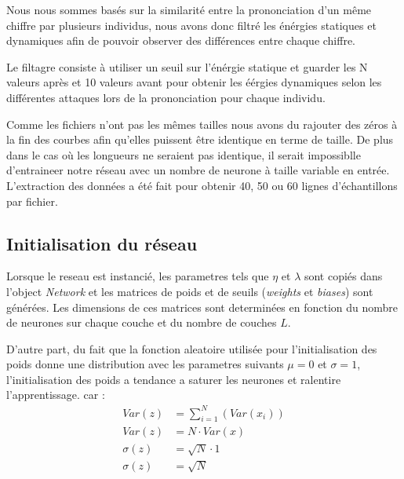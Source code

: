 \documentclass[11pt]{article}
\begin{document}
Nous nous sommes bas\'es sur la similarit\'e entre la prononciation d'un
m\^eme chiffre par plusieurs individus, nous avons donc filtr\'e les \'en\'ergies
statiques et dynamiques afin de pouvoir observer des diff\'erences entre chaque chiffre.


Le filtagre consiste \`a utiliser un seuil sur l'\'en\'ergie statique et
guarder les N valeurs apr\`es et 10 valeurs avant pour obtenir les \'e\'ergies
dynamiques selon les diff\'erentes attaques lors de la prononciation pour chaque
individu.

Comme les fichiers n'ont pas les m\^emes tailles nous avons du rajouter des
z\'eros \`a la fin des courbes afin qu'elles puissent \^etre identique en
terme de taille. De plus dans le cas o\`u les longueurs ne seraient pas
identique, il serait impossiblle d'entraineer notre r\'eseau avec un nombre
de neurone \`a taille variable en entr\'ee.
L'extraction des donn\'ees a \'et\'e fait pour obtenir 40, 50 ou 60 lignes
d'\'echantillons par fichier.



\subsection{Initialisation du r\'eseau}
Lorsque le reseau est instanci\'e, les parametres tels que $\eta$ et $\lambda$
sont copi\'es dans l'object
\emph{Network} et les matrices de poids et de seuils (\emph{weights} et
\emph{biases}) sont g\'en\'er\'ees. Les dimensions de ces matrices sont
determin\'ees en fonction du nombre de neurones sur chaque couche et du nombre
de couches $L$.


D'autre part, du fait que la fonction aleatoire utilis\'ee pour l'initialisation
des poids donne une distribution avec les parametres suivants $\mu=0$ et $\sigma=1$,
l'initialisation des poids a tendance a saturer les neurones et ralentire l'apprentissage.
car :
\begin{equation}
	\begin{aligned}
		Var(z) &= \sum_{i=1}^N(Var(x_i)) \\
		Var(z) &= N \cdot Var(x) \\
		\sigma(z) &= \sqrt{N} \cdot 1 \\
		\sigma(z) &= \sqrt{N}
	\end{aligned}
\end{equation}
\end{document}
